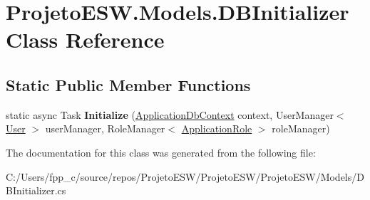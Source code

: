 \hypertarget{class_projeto_e_s_w_1_1_models_1_1_d_b_initializer}{}\section{Projeto\+E\+S\+W.\+Models.\+D\+B\+Initializer Class Reference}
\label{class_projeto_e_s_w_1_1_models_1_1_d_b_initializer}
\subsection*{Static Public Member Functions}
\begin{DoxyCompactItemize}
\item 
\mbox{\label{class_projeto_e_s_w_1_1_models_1_1_d_b_initializer_a2beccb0d8a60700ccc59290d1f796e63}} 
static async Task {\bfseries Initialize} (\mbox{\hyperlink{class_projeto_e_s_w_1_1_data_1_1_application_db_context}{Application\+Db\+Context}} context, User\+Manager$<$ \mbox{\hyperlink{class_projeto_e_s_w_1_1_models_1_1_user}{User}} $>$ user\+Manager, Role\+Manager$<$ \mbox{\hyperlink{class_projeto_e_s_w_1_1_models_1_1_application_role}{Application\+Role}} $>$ role\+Manager)
\end{DoxyCompactItemize}


The documentation for this class was generated from the following file\+:\begin{DoxyCompactItemize}
\item 
C\+:/\+Users/fpp\+\_\+c/source/repos/\+Projeto\+E\+S\+W/\+Projeto\+E\+S\+W/\+Projeto\+E\+S\+W/\+Models/D\+B\+Initializer.\+cs\end{DoxyCompactItemize}

